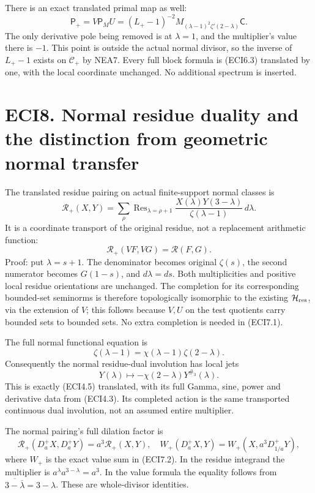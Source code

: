 There is an exact translated primal map as well: \[
\mathsf P_+=V\mathsf P_MU
=(L_+-1)^{-2}
M_{(\lambda-1)^2\zeta'(2-\lambda)}\mathsf C.
\tag{ECI7.5}
\] The only derivative pole being removed is at \(\lambda=1\), and the
multiplier's value there is \(-1\). This point is outside the actual
normal divisor, so the inverse of \(L_+-1\) exists on \(\mathscr C_+\)
by NEA7. Every full block formula is (ECI6.3) translated by one, with
the local coordinate unchanged. No additional spectrum is inserted.

\section{ECI8. Normal residue duality and the distinction from geometric
normal
transfer}\label{eci8.-normal-residue-duality-and-the-distinction-from-geometric-normal-transfer}

The translated residue pairing on actual finite-support normal classes
is \[
\mathcal R_+(X,Y)=\sum_{\rho}
\operatorname{Res}_{\lambda=\rho+1}
\frac{X(\lambda)Y(3-\lambda)}{\zeta(\lambda-1)}\,d\lambda.
\tag{ECI8.1}
\] It is a coordinate transport of the original residue, not a
replacement arithmetic function: \[
\mathcal R_+(VF,VG)=\mathcal R(F,G).
\tag{ECI8.2}
\] Proof: put \(\lambda=s+1\). The denominator becomes original
\(\zeta(s)\), the second numerator becomes \(G(1-s)\), and
\(d\lambda=ds\). Both multiplicities and positive local residue
orientations are unchanged. The completion for its corresponding
bounded-set seminorms is therefore topologically isomorphic to the
existing \(\mathcal H_{\rm res}\), via the extension of \(V\); this
follows because \(V,U\) on the test quotients carry bounded sets to
bounded sets. No extra completion is needed in (ECI7.1).

The full normal functional equation is \[
\zeta(\lambda-1)=\chi(\lambda-1)\zeta(2-\lambda).
\tag{ECI8.3}
\] Consequently the normal residue-dual involution has local jets \[
Y(\lambda)\longmapsto
-\chi(2-\lambda)Y^{\#_3}(\lambda).
\tag{ECI8.4}
\] This is exactly (ECI4.5) translated, with its full Gamma, sine, power
and derivative data from (ECI4.3). Its completed action is the same
transported continuous dual involution, not an assumed entire
multiplier.

The normal pairing's full dilation factor is \[
\mathcal R_+(D_a^+X,D_a^+Y)=a^3\mathcal R_+(X,Y),
\quad
W_+(D_a^+X,Y)=W_+(X,a^3D_{1/a}^+Y),
\tag{ECI8.5}
\] where \(W_+\) is the exact value sum in (ECI7.2). In the residue
integrand the multiplier is \(a^\lambda a^{3-\lambda}=a^3\). In the
value formula the equality follows from
\(\overline{3-\overline\lambda}=3-\lambda\). These are whole-divisor
identities.

